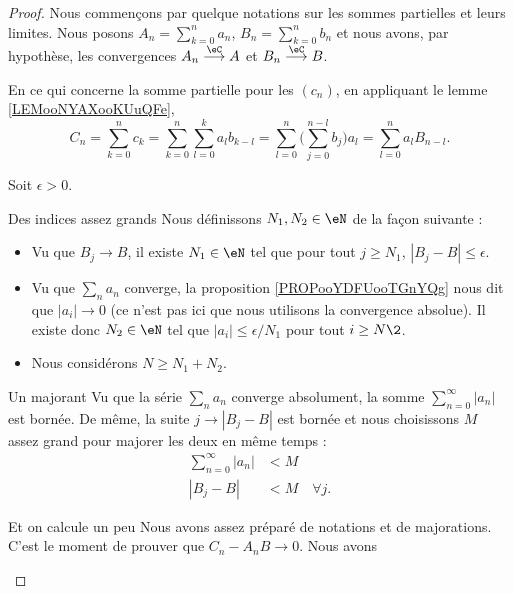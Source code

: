 \begin{proof}
    Nous commençons par quelque notations sur les sommes partielles et leurs limites. Nous posons \( A_n=\sum_{k=0}^na_n\), \( B_n=\sum_{k=0}^nb_n\) et nous avons, par hypothèse, les convergences \( A_n\stackrel{\eC}{\longrightarrow}A\) et \( B_n\stackrel{\eC}{\longrightarrow}B\).

    En ce qui concerne la somme partielle pour les \( (c_n)\), en appliquant le lemme \ref{LEMooNYAXooKUuQFe},
    \begin{equation}
        C_n=\sum_{k=0}^nc_k=\sum_{k=0}^n\sum_{l=0}^ka_lb_{k-l}=\sum_{l=0}^n\big( \sum_{j=0}^{n-l}b_j \big)a_l=\sum_{l=0}^na_lB_{n-l}.
    \end{equation}
    
    Soit \( \epsilon>0\). 
    \begin{subproof}
    \item[Des indices assez grands]
    Nous définissons \( N_1, N_2\in \eN\) de la façon suivante :
    \begin{itemize}
        \item 
    Vu que \( B_j\to B\), il existe \( N_1\in \eN\) tel que pour tout \( j\geq N_1\), \( | B_j-B |\leq \epsilon\).
\item
    Vu que \( \sum_na_n\) converge, la proposition \ref{PROPooYDFUooTGnYQg} nous dit que \( | a_i |\to 0\) (ce n'est pas ici que nous utilisons la convergence absolue). Il existe donc \( N_2\in \eN\) tel que \( | a_i |\leq \epsilon/N_1\) pour tout \( i\geq N\2\).
\item
    Nous considérons \( N\geq N_1+N_2\).
    \end{itemize}
\item[Un majorant]
    Vu que la série \( \sum_na_n\) converge absolument, la somme \( \sum_{n=0}^{\infty}| a_n |\) est bornée. De même, la suite \( j\to| B_j-B |\) est bornée et nous choisissons \( M\) assez grand pour majorer les deux en même temps :
    \begin{subequations}
        \begin{align}
            \sum_{n=0}^{\infty}| a_n |&<M           \label{SUBEQooBKCVooXnampA}\\
            | B_j-B |&<M\quad \forall j.
        \end{align}
    \end{subequations}
\item[Et on calcule un peu]
        Nous avons assez préparé de notations et de majorations. C'est le moment de prouver que \( C_n-A_nB \to 0\). Nous avons

\end{subproof}
\end{proof}
